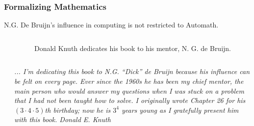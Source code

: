 \documentclass[10pt]{beamer}
\begin{document}
\begin{frame}
\frametitle{Formalizing Mathematics}

N.G. De Bruijn's influence in computing is not restricted to
{\color{blue} Automath}.

\vspace{5mm}

\begin{columns}
\begin{column}{0.2\textwidth} 
\end{column}
\begin{column}{0.7\textwidth}
\footnotesize{ Donald Knuth dedicates his book to his mentor, N. G. de Bruijn.}
\end{column}
\end{columns}

\vspace{5mm}

\begin{columns}
\begin{column}{0.2\textwidth} 
          \end{column}
  \begin{column}{0.7\textwidth}         {\scriptsize\em \color{blue}
... I'm dedicating this book to N.G. ``Dick'' de Bruijn
because his influence can be felt on every page.
Ever since the 1960s he has been my chief mentor, the main
person who would answer my questions when I was stuck on a
problem that I had not been taught how to solve. 
I originally wrote Chapter 26 for his $(3\cdot 4\cdot 5)$th birthday;
now he is $3^4$ years young as I gratefully present him with
this book. 
\hfill {\color{black}Donald E. Knuth}
     }
\end{column}
\end{columns}



\end{frame}
\end{document}
